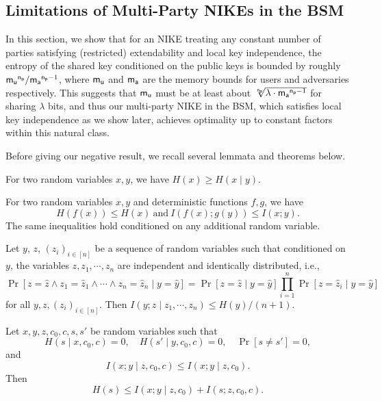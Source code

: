 \subsection{Limitations of Multi-Party NIKEs in the BSM}
\label{sec:negative}
In this section, we show that for an NIKE treating any constant number of parties satisfying (restricted) extendability and local key independence, the entropy of the shared key conditioned on the public keys is bounded by roughly $\mathsf{m_u}^{\mathsf{n_p}}/\mathsf{m_a}^{\mathsf{n_p}-1}$, where $\mathsf{m_u}$ and $\mathsf{m_a}$  are the memory bounds for users and adversaries respectively. This suggests that $\mathsf{m_u}$ must be at least about $\sqrt[\mathsf{n_p}]{\lambda\cdot\mathsf{m_a}^{\mathsf{n_p}-1}}$ for sharing $\lambda$ bits, and thus our multi-party NIKE in the BSM, which satisfies local key independence as we show later, achieves optimality up to constant factors within this natural class.

Before giving our negative result, we recall several lemmata and theorems below.
\begin{lemma}
\label{fact}
For two random variables $x, y$, we have
$H(x) \geq H(x\mid y)$.
\end{lemma}

\begin{theorem}
\label{prop:datap}
For two random variables $x, y$ and deterministic functions $f,g$, we have
\[
H(f(x))\leq H(x)
\ \mbox{and}\
I(f(x);g(y))\leq I(x;y).
\]
The same inequalities hold conditioned on any additional random variable.
\end{theorem}

\begin{lemma}
\label{lem:DM04}
Let $y$, $z$, $(z_i)_{i\in[n]}$ be a sequence of random variables such that conditioned on $y$, the variables $z, z_1,\cdots,z_n$ are independent and identically distributed, i.e.,
$$
\Pr[z=\widehat{z}\land z_1=\widehat z_1\land \cdots \land z_n=\widehat z_n \mid y=\widehat y]=\Pr[z=\widehat z\mid y=\widehat y]\prod_{i=1}^n\Pr[z=\widehat z_i\mid y=\widehat y]
$$
for all $y,z,(z_i)_{i\in[n]}$. Then
$
I(y;z\mid z_1,\cdots,z_n)\leq {H(y)}/({n+1}).
$
\end{lemma}

\begin{theorem}
\label{thm:M93}
Let $x,y,z,c_0,c,s,s'$ be random variables such that
\[
H(s\mid x,c_0,c)=0,\quad
H(s'\mid y,c_0,c)=0,\quad
\Pr[s\neq s']=0,
\]
and
\[
I(x;y\mid z,c_0,c)\leq I(x;y\mid z,c_0).
\]
Then
\[
H(s)\leq I(x;y\mid z,c_0)+I(s;z,c_0,c).
\]
\end{theorem}

